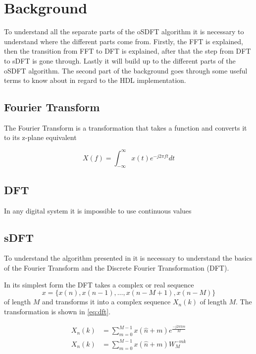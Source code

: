 \documentclass[../main.tex]{subfiles}
\begin{document}
\section{Background}%
\label{sec:background}

To understand all the separate parts of the oSDFT algorithm it is necessary to understand where the different parts come from. Firstly, the FFT is explained, then the transition from FFT to DFT is explained, after that the step from DFT to sDFT is gone through. Lastly it will build up to the different parts of the oSDFT algorithm.
The second part of the background goes through some useful terms to know about in regard to the HDL implementation.

\subsection{Fourier Transform}%
\label{sub:fourier_transform}

The Fourier Transform is a transformation that takes a function and converts it to its z-plane equivalent

\begin{equation}
    \label{eq:fourier_transform}
    X(f) = \int_{-\infty}^{\infty} x(t) e^{-j 2 \pi f t} dt 
\end{equation}


\subsection{DFT}%
\label{sub:dft}

In any digital system it is impossible to use continuous values 

\subsection{sDFT}%
\label{sub:sdft}

To understand the algorithm presented in \cite{osdft} it is necessary to understand the basics of the Fourier Transform and the Discrete Fourier Transformation (DFT).

In its simplest form the DFT takes a complex or real sequence $$x = \{x(n), x(n-1), \ldots, x(n-M+1), x(n-M)\}$$ of length $M$ and transforms it into a complex sequence $X_n(k)$ of length $M$. The transformation is shown in \eqref{eq:dft}.
  
\begin{equation}
    \label{eq:dft}
    \begin{split}
        X_n(k) &= \sum_{m=0}^{M-1} x(\hat{n}+m) e^{\frac{-j 2 \pi k m}{M}} \\
        X_n(k) &= \sum_{m=0}^{M-1} x(\hat{n}+m)W_M^{-mk}
    \end{split}
\end{equation}
\end{document}
